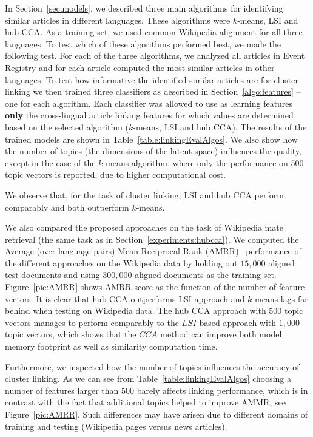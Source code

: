 \documentclass[twoside,11pt]{article}
\begin{document}
In Section~\ref{sec:models}, we  described three main algorithms for identifying similar articles in different languages. These algorithms were $k$-means, LSI and hub CCA. As a training set, we used common Wikipedia alignment for all three languages. To test which of these algorithms performed best, we made the following test. For each of the three algorithms, we analyzed all articles in Event Registry and for each article computed the most similar articles in other languages. To test how informative the identified similar articles are for cluster linking we then trained three classifiers as described in Section~\ref{algo:features} -- one for each algorithm. Each classifier was allowed to use as learning features \textbf{only} the cross-lingual article linking features for which values are determined based on the selected algorithm ($k$-means, LSI and hub CCA). The results of the trained models are shown in Table~\ref{table:linkingEvalAlgos}. We also show how the number of topics (the dimensions of the latent space) influences the quality, except in the case of the $k$-means algorithm, where only the performance on 500 topic vectors is reported, due to higher computational cost.

We observe that, for the task of cluster linking, LSI and hub CCA perform comparably and both outperform $k$-means.

We also compared the proposed approaches on the task of Wikipedia mate retrieval (the same task as in Section~\ref{experiments:hubcca}). We computed the Average (over language pairs) Mean Reciprocal Rank (AMRR)~  performance of the different approaches on the  Wikipedia data by holding out $15,000$ aligned test documents and using $300,000$ aligned documents as the training set. Figure~\ref{pic:AMRR} shows AMRR score as the function of the number of feature vectors. It is clear that hub CCA outperforms LSI approach and $k$-means lags far behind when testing on Wikipedia data. The hub CCA approach with $500$ topic vectors manages to perform comparably to the $LSI$-based approach with $1,000$ topic vectors, which shows that the $CCA$ method can improve both model memory footprint as well as similarity computation time.

Furthermore, we inspected how the number of topics influences the accuracy of cluster linking. As we can see from Table~\ref{table:linkingEvalAlgos} choosing a number of features larger than $500$ barely affects linking performance, which is in contrast with the fact that additional topics helped to improve AMMR, see Figure~\ref{pic:AMRR}. Such differences may have arisen due to different domains of training and testing (Wikipedia pages versus news articles).
\end{document}
